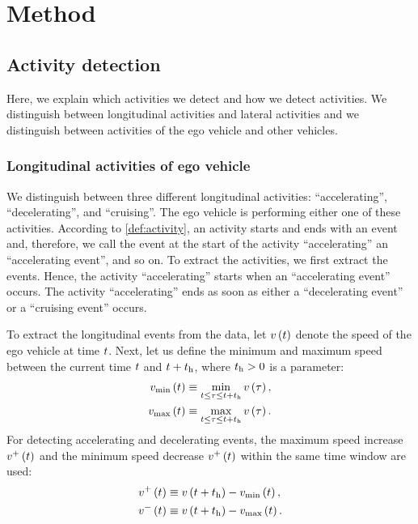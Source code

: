 \section{Method}
\label{sec:method}



\subsection{Activity detection}
\label{sec:activity detection}

Here, we explain which activities we detect and how we detect activities. We distinguish between longitudinal activities and lateral activities and we distinguish between activities of the ego vehicle and other vehicles.

\subsubsection{Longitudinal activities of ego vehicle}
\label{sec:longitudinal ego}

We distinguish between three different longitudinal activities: ``accelerating'', ``decelerating'', and ``cruising''. The ego vehicle is performing either one of these activities. According to \cref{def:activity}, an activity starts and ends with an event and, therefore, we call the event at the start of the activity ``accelerating'' an ``accelerating event'', and so on. To extract the activities, we first extract the events. Hence, the activity ``accelerating'' starts when an ``accelerating event'' occurs. The activity ``accelerating'' ends as soon as either a ``decelerating event'' or a ``cruising event'' occurs.

To extract the longitudinal events from the data, let $v\left(t\right)$ denote the speed of the ego vehicle at time $t$. Next, let us define the minimum and maximum speed between the current time $t$ and $t+t_{\mathrm{h}}$, where $t_{\mathrm{h}}>0$ is a parameter:
\begin{align}
	v_{\mathrm{min}}\left(t\right) &\equiv \min_{t \leq \tau \leq t+t_{\mathrm{h}}} v\left(\tau\right), \\
	v_{\mathrm{max}}\left(t\right) &\equiv \max_{t \leq \tau \leq t+t_{\mathrm{h}}} v\left(\tau\right).
\end{align}
For detecting accelerating and decelerating events, the maximum speed increase $v^{+}\left(t\right)$ and the minimum speed decrease $v^{+}\left(t\right)$ within the same time window are used:
\begin{align}
	v^{+}\left(t\right) &\equiv v\left(t + t_{\mathrm{h}}\right) - v_{\mathrm{min}}\left(t\right),\\
	v^{-}\left(t\right) &\equiv v\left(t + t_{\mathrm{h}}\right) - v_{\mathrm{max}}\left(t\right).
\end{align}

